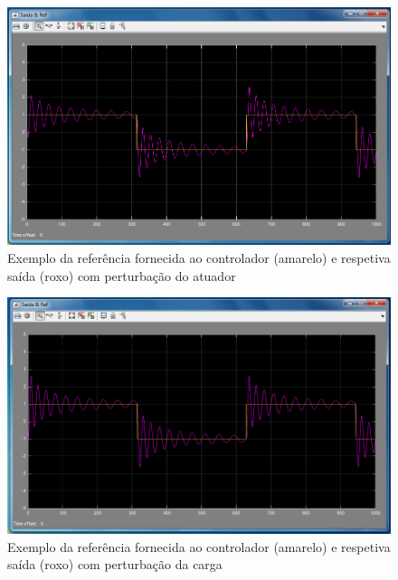\documentclass{article}
\begin{document}
\begin{figure}[H]
  \centering
      \includegraphics[scale=0.3]{Images/Mamdani_9_square_atuator.png}
  \caption{Exemplo da referência fornecida ao controlador (amarelo) e respetiva saída (roxo) com perturbação do atuador}
\end{figure}

\begin{figure}[H]
  \centering
      \includegraphics[scale=0.3]{Images/Mamdani_9_square_charge.png}
  \caption{Exemplo da referência fornecida ao controlador (amarelo) e respetiva saída (roxo) com perturbação da carga}
\end{figure}
\end{document}
